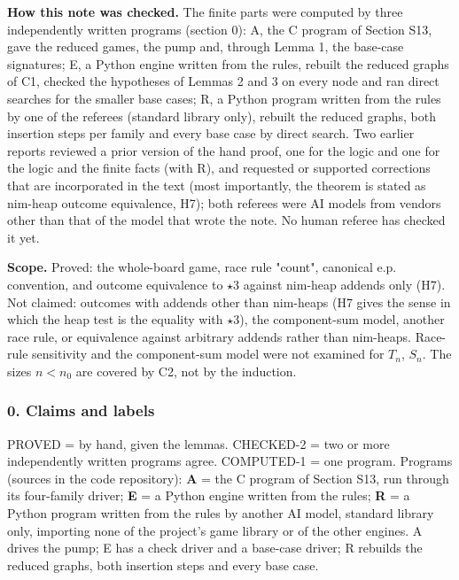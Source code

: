 \textbf{How this note was checked.} The finite parts were computed by three independently written programs (section 0): A, the C program of Section S13, gave the reduced games, the pump and, through Lemma 1, the base-case signatures; E, a Python engine written from the rules, rebuilt the reduced graphs of C1, checked the hypotheses of Lemmas 2 and 3 on every node and ran direct searches for the smaller base cases; R, a Python program written from the rules by one of the referees (standard library only), rebuilt the reduced graphs, both insertion steps per family and every base case by direct search. Two earlier reports reviewed a prior version of the hand proof, one for the logic and one for the logic and the finite facts (with R), and requested or supported corrections that are incorporated in the text (most importantly, the theorem is stated as nim-heap outcome equivalence, H7); both referees were AI models from vendors other than that of the model that wrote the note. No human referee has checked it yet.

\textbf{Scope.} Proved: the whole-board game, race rule "count", canonical e.p. convention, and outcome equivalence to $\star3$ against nim-heap addends only (H7). Not claimed: outcomes with addends other than nim-heaps (H7 gives the sense in which the heap test is the equality with $\star3$), the component-sum model, another race rule, or equivalence against arbitrary addends rather than nim-heaps. Race-rule sensitivity and the component-sum model were not examined for $T_n$, $S_n$. The sizes $n<n_0$ are covered by C2, not by the induction.

\subsubsection*{0. Claims and labels}
PROVED = by hand, given the lemmas. CHECKED-2 = two or more independently written programs agree. COMPUTED-1 = one program. Programs (sources in the code repository): \textbf{A} = the C program of Section S13, run through its four-family driver; \textbf{E} = a Python engine written from the rules; \textbf{R} = a Python program written from the rules by another AI model, standard library only, importing none of the project's game library or of the other engines. A drives the pump; E has a check driver and a base-case driver; R rebuilds the reduced graphs, both insertion steps and every base case.

